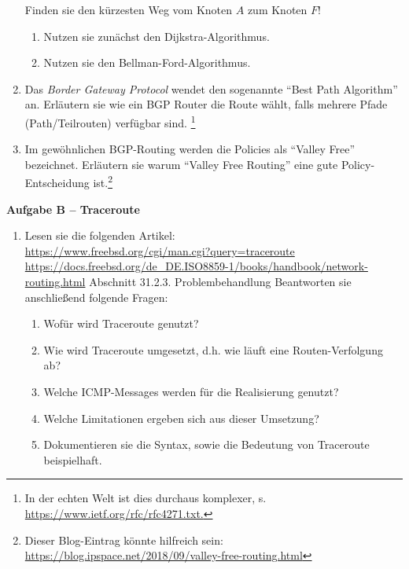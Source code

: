 \documentclass[paper=a4,fontsize=11pt]{scrartcl}%
\numberwithin{equation}{section}
\begin{document}
\begin{enumerate}
\begin{center}
	\end{center}
	Finden sie den kürzesten Weg vom Knoten $A$ zum Knoten $F$!
	\begin{enumerate}
		\item Nutzen sie zunächst den Dijkstra-Algorithmus.
		\item Nutzen sie den Bellman-Ford-Algorithmus.
	\end{enumerate}
	\item Das \emph{Border Gateway Protocol} wendet den sogenannte \enquote{Best Path Algorithm} an. Erläutern sie wie ein BGP Router die Route wählt, falls mehrere Pfade (Path/Teilrouten) verfügbar sind. \footnote{In der echten Welt ist dies durchaus komplexer, s. \url{https://www.ietf.org/rfc/rfc4271.txt.}}
	\item Im gewöhnlichen BGP-Routing werden die Policies als \enquote{Valley Free} bezeichnet. Erläutern sie warum \enquote{Valley Free Routing} eine gute Policy-Entscheidung ist.\footnote{Dieser Blog-Eintrag könnte hilfreich sein: \url{https://blog.ipspace.net/2018/09/valley-free-routing.html}}
\end{enumerate}

\begin{center}\Large{\textbf{Aufgabe B -- Traceroute}}\end{center}\vskip0.2in
\begin{enumerate}
	\item Lesen sie die folgenden Artikel:\\
	\url{https://www.freebsd.org/cgi/man.cgi?query=traceroute}\\
	\url{https://docs.freebsd.org/de_DE.ISO8859-1/books/handbook/network-routing.html} Abschnitt 31.2.3. Problembehandlung
	Beantworten sie anschließend folgende Fragen:
	\begin{enumerate}
		\item Wofür wird Traceroute genutzt?
		\item Wie wird Traceroute umgesetzt, d.h. wie läuft eine Routen-Verfolgung ab? 
		\item Welche ICMP-Messages werden für die Realisierung genutzt?
		\item Welche Limitationen ergeben sich aus dieser Umsetzung?
		\item Dokumentieren sie die Syntax, sowie die Bedeutung von Traceroute beispielhaft.
	\end{enumerate}
\end{enumerate}	
\end{document}

